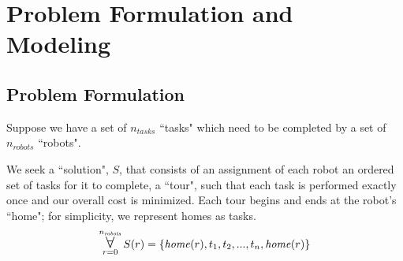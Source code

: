 \documentclass[a4paper]{article}
\newcommand\Forall{\mathop{\mbox{\Large $\mathsurround0pt\forall$}}}
\begin{document}
%

\section{Problem Formulation and Modeling}


%
%


\subsection{Problem Formulation}

Suppose we have a set of $n_\mathit{tasks}$ ``tasks" which need to be completed by a set of $n_\mathit{robots}$ ``robots".

We seek a ``solution", $S$, that consists of an assignment of each robot an ordered set of tasks for it to complete, a ``tour", such that each task is performed exactly once and our overall cost is minimized. Each tour begins and ends at the robot's ``home"; for simplicity, we represent homes as tasks.
$$
\Forall_{r=0}^{n_\mathit{robots}}
S(r) = \{ \mathit{home}(r), t_1, t_2, ..., t_n, \mathit{home}(r) \}
$$
\end{document}

